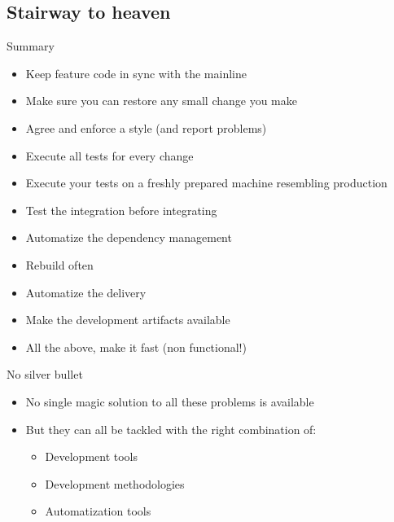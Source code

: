 \documentclass[presentation]{beamer}
\begin{document}
\subsection{Stairway to heaven}

\begin{frame}[fragile]{Summary}
	\begin{itemize}
		\item Keep feature code in sync with the mainline
		\item Make sure you can restore any small change you make
		\item Agree and enforce a style (and report problems)
		\item Execute all tests for every change
		\item Execute your tests on a freshly prepared machine resembling production
		\item Test the integration before integrating
		\item Automatize the dependency management
		\item Rebuild often
		\item Automatize the delivery
		\item Make the development artifacts available
		\item All the above, make it fast (non functional!)
	\end{itemize}
\end{frame}

\begin{frame}[fragile]{No silver bullet}
	\begin{itemize}
		\item No single magic solution to all these problems is available
		\item But they can all be tackled with the right combination of:
		\begin{itemize}
			\item Development tools
			\item Development methodologies
			\item Automatization tools
		\end{itemize}
	\end{itemize}
\end{frame}
\end{document}
